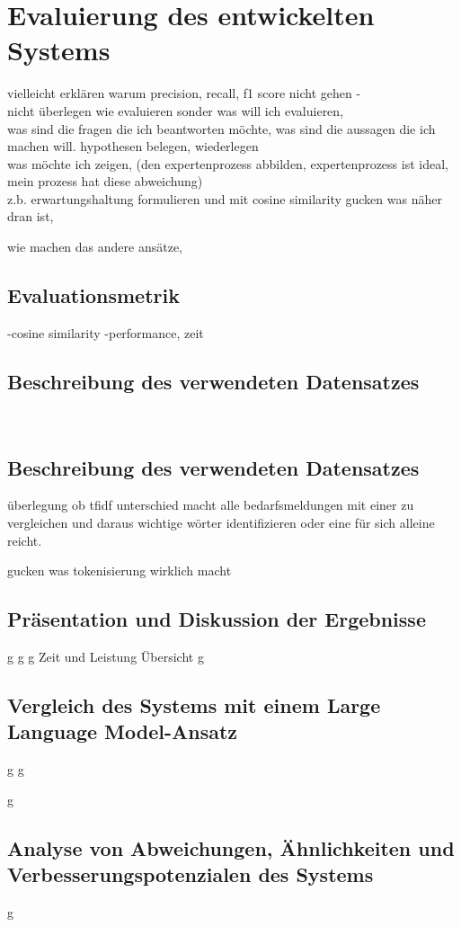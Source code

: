 \chapter{Evaluierung des entwickelten Systems}
\label{chap:evaluation}

vielleicht erklären warum precision, recall, f1 score nicht gehen -\\

nicht überlegen wie evaluieren sonder was will ich evaluieren,\\
was sind die fragen die ich beantworten möchte, was sind die aussagen die ich machen will. hypothesen belegen, wiederlegen\\
was möchte ich zeigen, (den expertenprozess abbilden, expertenprozess ist ideal, mein prozess hat diese abweichung)\\

z.b. erwartungshaltung formulieren und mit cosine similarity gucken was näher dran ist,

wie machen das andere ansätze,

\section{Evaluationsmetrik}
-cosine similarity
-performance, zeit

\section{Beschreibung des verwendeten Datensatzes}
\\
\newpage

\section{Beschreibung des verwendeten Datensatzes}

überlegung ob tfidf unterschied macht alle bedarfsmeldungen mit einer zu vergleichen und daraus wichtige wörter identifizieren oder eine für sich alleine reicht.

gucken was tokenisierung wirklich macht
\section{Präsentation und Diskussion der Ergebnisse}
\newpage
g
\newpage
g
\newpage
g
\newpage
Zeit und Leistung Übersicht
\newpage
g
\newpage

\section{Vergleich des Systems mit einem Large Language Model-Ansatz}
\newpage
g
\newpage
g
\newpage

g
\newpage

\section{Analyse von Abweichungen, Ähnlichkeiten und Verbesserungspotenzialen des Systems}
\newpage
g
\newpage
